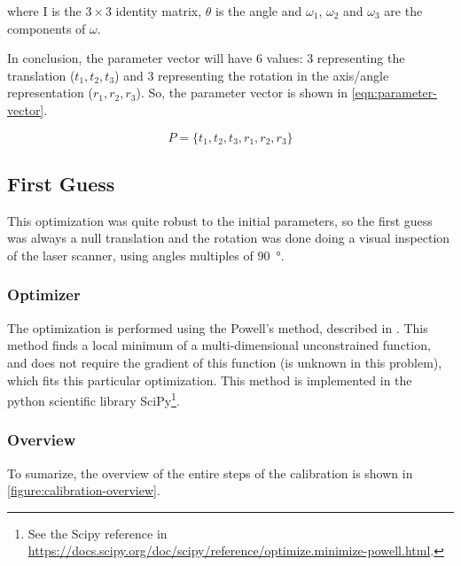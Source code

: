 \noindent
where I is the $3\times3$ identity matrix, $\theta$ is the angle and $\omega_1$, $\omega_2$ and $\omega_3$ are the components of $\omega$.

In conclusion, the parameter vector will have 6 values: 3 representing the translation ($t_1, t_2, t_3$) and 3 representing the rotation in the axis/angle representation ($r_1, r_2, r_3$). So, the parameter vector is shown in \cref{eqn:parameter-vector}.

\begin{equation}
    \label{eqn:parameter-vector}
    P = \{t_1, t_2, t_3, r_1, r_2, r_3\}
\end{equation}

\subsection{First Guess}

This optimization was quite robust to the initial parameters, so the first guess was always a null translation and the rotation was done doing a visual inspection of the laser scanner, using angles multiples of \SI{90}{\degree}.

\subsubsection{Optimizer}

The optimization is performed using the Powell's method, described in \cite{powell64}. This method finds a local minimum of a multi-dimensional unconstrained function, and does not require the gradient of this function (is unknown in this problem), which fits this particular optimization. This method is implemented in the python scientific library SciPy\footnote{See the Scipy reference in \url{https://docs.scipy.org/doc/scipy/reference/optimize.minimize-powell.html}.}.

\subsubsection{Overview}

To sumarize, the overview of the entire steps of the calibration is shown in \cref{figure:calibration-overview}.

